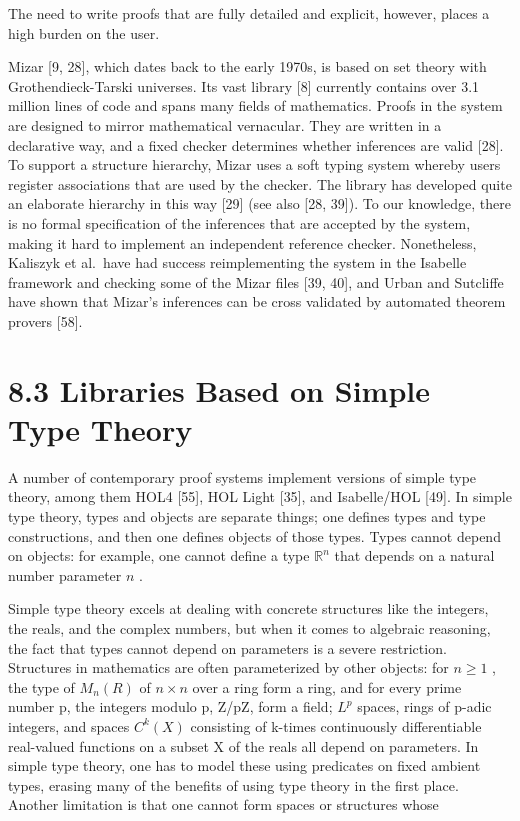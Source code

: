 \documentclass[
]{article}
\begin{document}
The need to write proofs that are fully detailed and explicit, however,
places a high burden on the user.

Mizar {[}9, 28{]}, which dates back to the early 1970s, is based on set
theory with Grothendieck-Tarski universes. Its vast library {[}8{]}
currently contains over 3.1 million lines of code and spans many fields
of mathematics. Proofs in the system are designed to mirror mathematical
vernacular. They are written in a declarative way, and a fixed checker
determines whether inferences are valid {[}28{]}. To support a structure
hierarchy, Mizar uses a soft typing system whereby users register
associations that are used by the checker. The library has developed
quite an elaborate hierarchy in this way {[}29{]} (see also {[}28,
39{]}). To our knowledge, there is no formal specification of the
inferences that are accepted by the system, making it hard to implement
an independent reference checker. Nonetheless, Kaliszyk et al.~have had
success reimplementing the system in the Isabelle framework and checking
some of the Mizar files {[}39, 40{]}, and Urban and Sutcliffe have shown
that Mizar's inferences can be cross validated by automated theorem
provers {[}58{]}.

\section{8.3 Libraries Based on Simple Type
Theory}\label{libraries-based-on-simple-type-theory}

A number of contemporary proof systems implement versions of simple type
theory, among them HOL4 {[}55{]}, HOL Light {[}35{]}, and Isabelle/HOL
{[}49{]}. In simple type theory, types and objects are separate things;
one defines types and type constructions, and then one defines objects
of those types. Types cannot depend on objects: for example, one cannot
define a type \(\mathbb{R}^n\) that depends on a natural number
parameter \(n\) .

Simple type theory excels at dealing with concrete structures like the
integers, the reals, and the complex numbers, but when it comes to
algebraic reasoning, the fact that types cannot depend on parameters is
a severe restriction. Structures in mathematics are often parameterized
by other objects: for \(n \geq 1\) , the type of \(M_{n}(R)\) of
\(n \times n\) over a ring form a ring, and for every prime number p,
the integers modulo p, Z/pZ, form a field; \(L^{p}\) spaces, rings of
p-adic integers, and spaces \(C^{k}(X)\) consisting of k-times
continuously differentiable real-valued functions on a subset X of the
reals all depend on parameters. In simple type theory, one has to model
these using predicates on fixed ambient types, erasing many of the
benefits of using type theory in the first place. Another limitation is
that one cannot form spaces or structures whose
\end{document}
